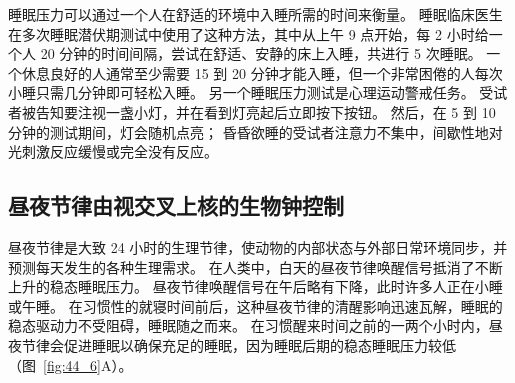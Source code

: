 睡眠压力可以通过一个人在舒适的环境中入睡所需的时间来衡量。
睡眠临床医生在多次睡眠潜伏期测试中使用了这种方法，其中从上午 9 点开始，每 2 小时给一个人 20 分钟的时间间隔，尝试在舒适、安静的床上入睡，共进行 5 次睡眠。
一个休息良好的人通常至少需要 15 到 20 分钟才能入睡，但一个非常困倦的人每次小睡只需几分钟即可轻松入睡。
另一个睡眠压力测试是心理运动警戒任务。
受试者被告知要注视一盏小灯，并在看到灯亮起后立即按下按钮。
然后，在 5 到 10 分钟的测试期间，灯会随机点亮；
昏昏欲睡的受试者注意力不集中，间歇性地对光刺激反应缓慢或完全没有反应。



\subsection{昼夜节律由视交叉上核的生物钟控制}

昼夜节律是大致 24 小时的生理节律，使动物的内部状态与外部日常环境同步，并预测每天发生的各种生理需求。
在人类中，白天的昼夜节律唤醒信号抵消了不断上升的稳态睡眠压力。
昼夜节律唤醒信号在午后略有下降，此时许多人正在小睡或午睡。
在习惯性的就寝时间前后，这种昼夜节律的清醒影响迅速瓦解，睡眠的稳态驱动力不受阻碍，睡眠随之而来。
在习惯醒来时间之前的一两个小时内，昼夜节律会促进睡眠以确保充足的睡眠，因为睡眠后期的稳态睡眠压力较低（图~\ref{fig:44_6}A）。


